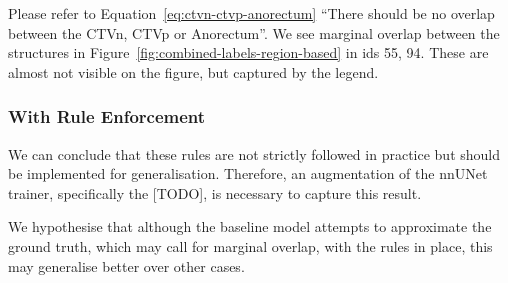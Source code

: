\documentclass[12pt,twoside]{report}
\begin{document}
Please refer to Equation~\ref{eq:ctvn-ctvp-anorectum} ``There should be no overlap between the CTVn, CTVp or Anorectum''. We see marginal overlap between the structures in Figure~\ref{fig:combined-labels-region-based} in ids 55, 94. These are almost not visible on the figure, but captured by the legend. 

\subsubsection{With Rule Enforcement}

We can conclude that these rules are not strictly followed in practice but should be implemented for generalisation. Therefore, an augmentation of the nnUNet trainer, specifically the [TODO], is necessary to capture this result.

We hypothesise that although the baseline model attempts to approximate the ground truth, which may call for marginal overlap, with the rules in place, this may generalise better over other cases.
\end{document}
